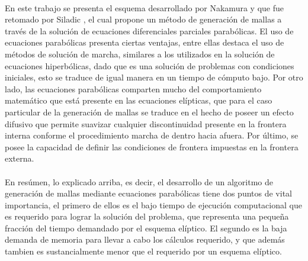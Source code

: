 \documentclass[letterpaper, openright, 12pt]{book}
\begin{document}
    \paragraph*{}
        En este trabajo se presenta el esquema desarrollado por Nakamura
        \cite{nakamuraParabolic} y que fue retomado por Siladic
        \cite{siladicParabolic}, el cual propone un método de generación de
        mallas a través de la solución de ecuaciones diferenciales parciales
        parabólicas. El uso de ecuaciones parabólicas presenta ciertas ventajas,
        entre ellas destaca el uso de métodos de solución de marcha, similares
        a los utilizados en la solución de ecuaciones hiperbólicas, dado que es
        una solución de problemas con condiciones iniciales, esto se traduce de
        igual manera en un tiempo de cómputo bajo. Por otro lado, las ecuaciones
        parabólicas comparten mucho del comportamiento matemático que está
        presente en las ecuaciones elípticas, que para el caso particular de la
        generación de mallas se traduce en el hecho de poseer un efecto difusivo
        que permite suavizar cualquier discontinuidad presente en la frontera
        interna conforme el procedimiento marcha de dentro hacia afuera. Por
        último, se posee la capacidad de definir las condiciones de frontera
        impuestas en la frontera externa.
    \paragraph*{}
        En resúmen, lo explicado arriba, es decir, el desarrollo de un algoritmo
        de generación de mallas mediante ecuaciones parabólicas tiene dos puntos
        de vital importancia, el primero de ellos es el bajo tiempo de ejecución
        computacional que es requerido para lograr la solución del problema, que
        representa una pequeña fracción del tiempo demandado por el esquema
        elíptico. El segundo es la baja demanda de memoria para llevar a cabo
        los cálculos requerido, y que además tambien es sustancialmente menor
        que el requerido por un esquema elíptico.
\end{document}
